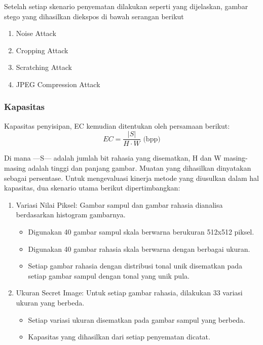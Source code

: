 \documentclass{ittelkom}
\begin{document}
Setelah setiap skenario penyematan dilakukan seperti yang dijelaskan, gambar
stego yang dihasilkan diekspos di bawah serangan berikut

\begin{enumerate}
    \item Noise Attack
    \item Cropping Attack
    \item Scratching Attack
    \item JPEG Compression Attack
\end{enumerate}

\subsubsection{Kapasitas}

Kapasitas penyisipan, EC kemudian ditentukan oleh persamaan berikut:
\begin{equation}
    EC = \frac{|S|}{H \cdot W} \text{ (bpp)}
\end{equation}

Di mana —S— adalah jumlah bit rahasia yang disematkan, H dan W masing-masing
adalah tinggi dan panjang gambar. Muatan yang dihasilkan dinyatakan sebagai
persentase. Untuk mengevaluasi kinerja metode yang diusulkan dalam hal
kapasitas, dua skenario utama berikut dipertimbangkan:

\begin{enumerate}
    \item Variasi Nilai Piksel: Gambar sampul dan gambar rahasia dianalisa berdasarkan
          histogram gambarnya.
          \begin{itemize}
              \item Digunakan 40 gambar sampul skala berwarna berukuran 512x512 piksel.
              \item Digunakan 40 gambar rahasia skala berwarna dengan berbagai ukuran.
              \item Setiap gambar rahasia dengan distribusi tonal unik disematkan pada setiap
                    gambar sampul dengan tonal yang unik pula.
          \end{itemize}
    \item Ukuran Secret Image: Untuk setiap gambar rahasia, dilakukan 33 variasi ukuran
          yang berbeda.
          \begin{itemize}
              \item Setiap variasi ukuran disematkan pada gambar sampul yang berbeda.
              \item Kapasitas yang dihasilkan dari setiap penyematan dicatat.
          \end{itemize}
\end{enumerate}
\end{document}
